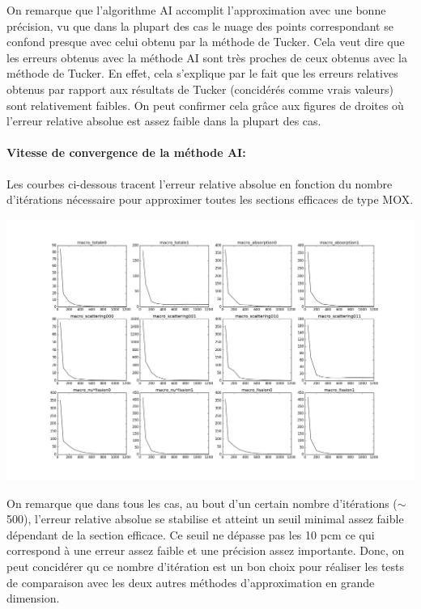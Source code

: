 \hspace{0.5cm} On remarque que l'algorithme AI accomplit l'approximation avec une bonne précision, vu que dans la plupart des cas le nuage des points correspondant se confond presque avec celui obtenu par la méthode de Tucker.
Cela veut dire que les erreurs obtenus avec la méthode AI sont très proches de ceux obtenus avec la méthode de Tucker. En effet, cela s'explique par le fait que les erreurs relatives obtenus par rapport aux résultats de Tucker (concidérés comme vrais valeurs) sont relativement faibles.
On peut confirmer cela grâce aux figures de droites où l'erreur relative absolue est assez faible dans la plupart des cas.
\newpage
\paragraph{Vitesse de convergence de la méthode AI:\\}
\hspace{0.5cm}
Les courbes ci-dessous tracent l'erreur relative absolue en fonction du nombre d'itérations nécessaire pour approximer toutes les sections efficaces de type MOX.
\begin{center}
\includegraphics[height= 9 cm,width = \linewidth]{images/MOX/Convergence_speed.png}
\end{center}
\hspace{0.5cm} On remarque que dans tous les cas, au bout d'un certain nombre d'itérations ($\sim$ 500), l'erreur relative absolue se stabilise et atteint un seuil minimal assez faible dépendant de la section efficace.
Ce seuil ne dépasse pas les 10 pcm ce qui correspond à une erreur assez faible et une précision assez importante. Donc, on peut concidérer qu ce nombre d'itération est un bon choix pour réaliser
les tests de comparaison avec les deux autres méthodes d'approximation en grande dimension.
